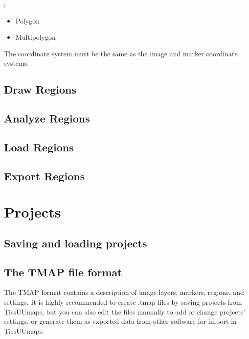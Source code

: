 \documentclass[letterpaper,10pt,english,openany,oneside]{sphinxmanual}
\begin{document}
\sphinxAtStartPar
{}:
\begin{itemize}
\item {} 
\sphinxAtStartPar
Polygon

\item {} 
\sphinxAtStartPar
Multipolygon

\end{itemize}

\sphinxAtStartPar
The coordinate system must be the same as the image and marker coordinate systems.


\subsection{Draw Regions}
\label{\detokenize{docs/starting/regions:draw-regions}}

\subsection{Analyze Regions}
\label{\detokenize{docs/starting/regions:analyze-regions}}

\subsection{Load Regions}
\label{\detokenize{docs/starting/regions:load-regions}}

\subsection{Export Regions}
\label{\detokenize{docs/starting/regions:export-regions}}
\sphinxstepscope


\section{Projects}
\label{\detokenize{docs/starting/projects:projects}}\label{\detokenize{docs/starting/projects::doc}}

\subsection{Saving and loading projects}
\label{\detokenize{docs/starting/projects:saving-and-loading-projects}}

\subsection{The TMAP file format}
\label{\detokenize{docs/starting/projects:the-tmap-file-format}}
\sphinxAtStartPar
The TMAP format contains a description of image layers, markers, regions, and settings. It is highly recommended to create .tmap files by saving projects from TissUUmaps, but you can also edit the files manually to add or change projects’ settings, or generate them as exported data from other software for import in TissUUmaps.
\end{document}
